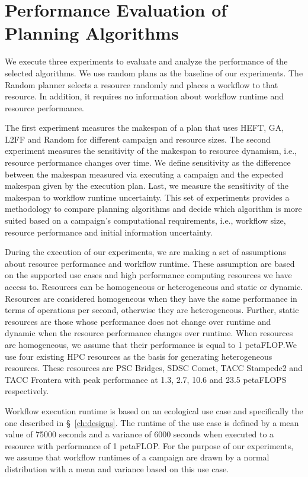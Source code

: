 \section{Performance Evaluation of Planning Algorithms}
\label{sec:algo_perf_comp}

We execute three experiments to evaluate and analyze the performance of the 
selected algorithms. We use random plans as the baseline of our experiments.
The Random planner selects a resource randomly and places a workflow to that 
resource. In addition, it requires no information about workflow runtime and 
resource performance.

The first experiment measures the makespan of a plan that uses HEFT, GA, L2FF 
and Random for different campaign and resource sizes. The second experiment 
measures the sensitivity of the makespan to resource dynamism, i.e., resource 
performance changes over time. We define sensitivity as the difference between 
the makespan measured via executing a campaign and the expected makespan given 
by the execution plan. Last, we measure the sensitivity of the makespan to 
workflow runtime uncertainty. This set of experiments provides a methodology 
to compare planning algorithms and decide which algorithm is more suited based 
on a campaign's computational requirements, i.e., workflow size, resource 
performance and initial information uncertainty.

During the execution of our experiments, we are making a set of assumptions 
about resource performance and workflow runtime. These assumption are based on 
the supported use cases and high performance computing resources we have 
access to. Resources can be homogeneous or heterogeneous and static or dynamic.
Resources are considered homogeneous when they have the same performance in 
terms of operations per second, otherwise they are heterogeneous. Further, 
static resources are those whose performance does not change over runtime and 
dynamic when the resource performance changes over runtime. When resources are 
homogeneous, we assume that their performance is equal to 1 petaFLOP.We use 
four existing HPC resources as the basis for generating heterogeneous 
resources. These resources are PSC Bridges, SDSC Comet, TACC Stampede2 and 
TACC Frontera with peak performance at 1.3, 2.7, 10.6 and 23.5 petaFLOPS 
respectively.

Workflow execution runtime is based on an ecological use case and specifically 
the one described in \S~\ref{ch:designs}. The runtime of the use case is 
defined by a mean value of 75000 seconds and a variance of 6000 seconds when 
executed to a resource with performance of 1 petaFLOP. For the purpose of our 
experiments, we assume that workflow runtimes of a campaign are drawn by a 
normal distribution with a mean and variance based on this use case.


